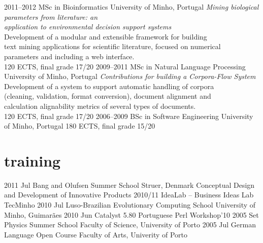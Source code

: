 \documentclass[a4paper]{friggeri-cv}
\begin{document}
\begin{entrylist}
  \entry
    {2011--2012}
    {MSc in Bioinformatics}
    {University of Minho, Portugal}
    {\emph{Mining biological parameters from literature: an\\
    application to environmental decision support systems}\\
    {\footnotesize{Development of a modular and extensible framework
    for building\\
    text mining applications for scientific literature, focused on
    numerical\\ 
    parameters and including a web interface.}}\\
    120 ECTS, final grade 17/20
    }
  \entry
    {2009--2011}
    {MSc in Natural Language Processing}
    {University of Minho, Portugal}
    {\emph{Contributions for building a Corpora-Flow System}\\
    {\footnotesize{Development of a system to support automatic handling of corpora\\
    (cleaning, validation, format conversion), document alignment and\\
    calculation alignability metrics of several types of documents.}}\\
    120 ECTS, final grade 17/20
    }
  \entry
    {2006--2009}
    {BSc in Software Engineering}
    {University of Minho, Portugal}
    {180 ECTS, final grade 15/20}
\end{entrylist}


\section{training}
\begin{entrylist}
    \entry
        {2011 {\footnotesize Jul}}
        {Bang and Olufsen Summer School}
        {Struer, Denmark}
        {Conceptual Design and Development of Innovative Products}
    \entry
        {2010/11}
        {IdeaLab -- Business Ideas Lab}
        {TecMinho}
        {\vspace{-0.8cm}}
    \entry
        {2010 {\footnotesize Jul}}
        {Luso-Brazilian Evolutionary Computing School}
        {University of Minho, Guimarães}
        {\vspace{-0.8cm}}
    \entry
        {2010 {\footnotesize Jun}}
        {Catalyst 5.80}
        {Portuguese Perl Workshop'10}
        {\vspace{-0.8cm}}
    \entry
        {2005 {\footnotesize Set}}
        {Physics Summer School}
        {Faculty of Science, University of Porto}
        {\vspace{-0.8cm}}
    \entry
        {2005 {\footnotesize Jul}}
        {German Language Open Course}
        {Faculty of Arts, Univerity of Porto}
        {\vspace{-0.8cm}}
\end{entrylist}
\end{document}
